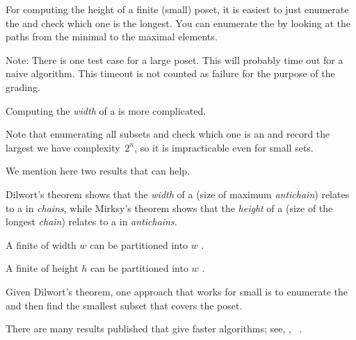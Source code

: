 

\begin{hint}
    For computing the height of a finite (small) poset, it is easiest to just enumerate the  and check which one is the longest.
    You can enumerate the  by looking at the paths from the minimal to the maximal elements.
\end{hint}

Note: There is one test case for a large poset.
This will probably time out for a naive algorithm.
This timeout is not counted as failure for the purpose of the grading.

\begin{hint}
    Computing the \emph{width} of a  is more complicated.

    Note that enumerating all subsets and check which one is an  and record the largest we have complexity~$2^n$, so it is impracticable even for small sets.

    We mention here two results that can help.

    Dilwort's theorem shows that the \emph{width} of a  (size of maximum \emph{antichain}) relates to a  in \emph{chains}, while Mirksy's theorem shows that the \emph{height} of a  (size of the longest \emph{chain}) relates to a  in \emph{antichains}.

    \begin{theorem}
        \label{thm:dilwort}
        A finite  of width $w$ can be partitioned into $w$ .
    \end{theorem}

    \begin{theorem}
        \label{thm:mirsky}
        A finite  of height $h$ can be partitioned into $w$ .
    \end{theorem}

    Given Dilwort's theorem, one approach that works for small  is to enumerate the  and then find the smallest subset that covers the poset.

    There are many results published that give faster algorithms; see, \eg, ~\cite{chen12decomposition}.

\end{hint}

